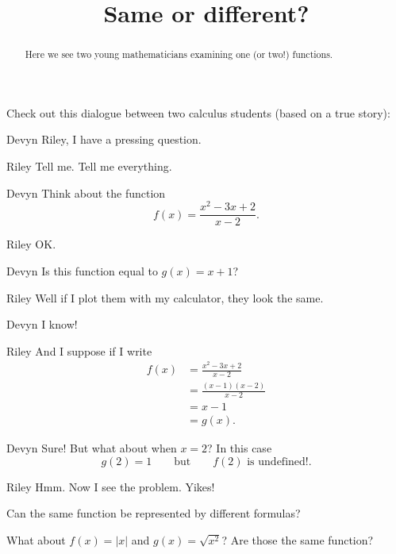 \documentclass{ximera}
\title[Break-Ground:]{Same or different?}
\begin{document}
\begin{abstract}
  Here we see two young mathematicians examining one (or two!)
  functions.
\end{abstract}
\maketitle

Check out this dialogue between two calculus students (based on a true
story):

\begin{dialogue}
\item[Devyn] Riley, I have a pressing question.
\item[Riley] Tell me. Tell me everything.
\item[Devyn] Think about the function
  \[
  f(x) = \frac{x^2 - 3x + 2}{x-2}.
  \]
\item[Riley] OK.
\item[Devyn] Is this function equal to $g(x) = x+1$?
\item[Riley] Well if I plot them with my calculator, they look the
  same.
\item[Devyn] I know!
\item[Riley] And I suppose if I write
  \begin{align*}
    f(x) &= \frac{x^2 - 3x + 2}{x-2} \\
    &= \frac{(x-1)(x-2)}{x-2} \\
    &= x-1 \\
    &= g(x).
  \end{align*}
\item[Devyn] Sure! But what about when $x=2$? In this case
  \[
  g(2) = 1\qquad\text{but}\qquad f(2) \text{ is undefined!}.
  \]
\item[Riley] Hmm. Now I see the problem. Yikes!
\end{dialogue}

\begin{problem}
  Can the same function be represented by different formulas?

  \begin{multipleChoice}
  \end{multipleChoice}

  \begin{problem}
    What about $f(x) = |x|$ and $g(x) = \sqrt{x^2}$?  Are those the same function?

    \begin{multipleChoice}
    \end{multipleChoice}
  \end{problem}
\end{problem}
\end{document}
